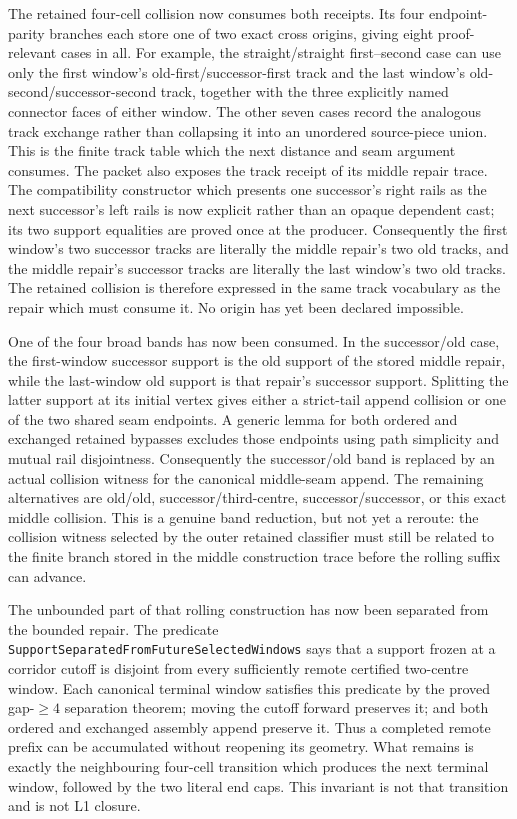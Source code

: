 \documentclass[11pt]{article}
\theoremstyle{definition}
\begin{document}
The retained four-cell collision now consumes both receipts.  Its four
endpoint-parity branches each store one of two exact cross origins, giving
eight proof-relevant cases in all.  For example, the
straight/straight first--second case can use only the first window's
old-first/successor-first track and the last window's
old-second/successor-second track, together with the three explicitly named
connector faces of either window.  The other seven cases record the analogous
track exchange rather than collapsing it into an unordered source-piece
union.  This is the finite track table which the next distance and seam
argument consumes.  The packet also exposes the track receipt of its middle
repair trace.  The compatibility constructor which presents one successor's
right rails as the next successor's left rails is now explicit rather than an
opaque dependent cast; its two support equalities are proved once at the
producer.  Consequently the first window's two successor tracks are literally
the middle repair's two old tracks, and the middle repair's successor tracks
are literally the last window's two old tracks.  The retained collision is
therefore expressed in the same track vocabulary as the repair which must
consume it.  No origin has yet been declared impossible.

One of the four broad bands has now been consumed.  In the
successor/old case, the first-window successor support is the old support of
the stored middle repair, while the last-window old support is that repair's
successor support.  Splitting the latter support at its initial vertex gives
either a strict-tail append collision or one of the two shared seam
endpoints.  A generic lemma for both ordered and exchanged retained bypasses
excludes those endpoints using path simplicity and mutual rail disjointness.
Consequently the successor/old band is replaced by an actual collision
witness for the canonical middle-seam append.  The remaining alternatives
are old/old, successor/third-centre, successor/successor, or this exact
middle collision.  This is a genuine band reduction, but not yet a reroute:
the collision witness selected by the outer retained classifier must still be
related to the finite branch stored in the middle construction trace before
the rolling suffix can advance.

The unbounded part of that rolling construction has now been separated from
the bounded repair.  The predicate
\texttt{SupportSeparatedFromFutureSelectedWindows} says that a support frozen
at a corridor cutoff is disjoint from every sufficiently remote certified
two-centre window.  Each canonical terminal window satisfies this predicate
by the proved gap-$\geq4$ separation theorem; moving the cutoff forward
preserves it; and both ordered and exchanged assembly append preserve it.
Thus a completed remote prefix can be accumulated without reopening its
geometry.  What remains is exactly the neighbouring four-cell transition
which produces the next terminal window, followed by the two literal end
caps.  This invariant is not that transition and is not L1 closure.
\end{document}
